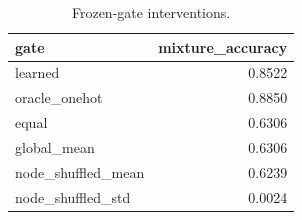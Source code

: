\begin{table}[t]
\centering
\begin{tabular}{lr}
\hline
gate & mixture\_accuracy \\
\hline
learned & 0.8522 \\
oracle\_onehot & 0.8850 \\
equal & 0.6306 \\
global\_mean & 0.6306 \\
node\_shuffled\_mean & 0.6239 \\
node\_shuffled\_std & 0.0024 \\
\hline
\end{tabular}
\caption{Frozen-gate interventions.}
\end{table}
